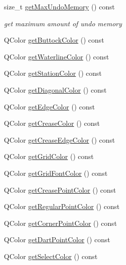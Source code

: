 \begin{DoxyCompactItemize}
size\-\_\-t \hyperlink{classShipCAD_1_1Preferences_a8ddfbabd8be21f6390f3750600047a87}{get\-Max\-Undo\-Memory} () const 
\begin{DoxyCompactList}\small\item\em get maximum amount of undo memory \end{DoxyCompactList}\item 
Q\-Color \hyperlink{classShipCAD_1_1Preferences_aa34f502af478c340ff359c76b90620c0}{get\-Buttock\-Color} () const 
\item 
Q\-Color \hyperlink{classShipCAD_1_1Preferences_a518043b34395026be6ebcf8f4e6e6591}{get\-Waterline\-Color} () const 
\item 
Q\-Color \hyperlink{classShipCAD_1_1Preferences_a39e4abd32055512f8009f4c8ab5cd379}{get\-Station\-Color} () const 
\item 
Q\-Color \hyperlink{classShipCAD_1_1Preferences_a238b56f29c89be9c2d9533cb9db21552}{get\-Diagonal\-Color} () const 
\item 
Q\-Color \hyperlink{classShipCAD_1_1Preferences_a45b78b4d109d2060ae7dd2c6da4e91df}{get\-Edge\-Color} () const 
\item 
Q\-Color \hyperlink{classShipCAD_1_1Preferences_a2d894224f95d2eff87f3086e23ae95a4}{get\-Crease\-Color} () const 
\item 
Q\-Color \hyperlink{classShipCAD_1_1Preferences_a98a2931bbf4565d110243b5c4bdca0ca}{get\-Crease\-Edge\-Color} () const 
\item 
Q\-Color \hyperlink{classShipCAD_1_1Preferences_a02a4e2aeef1d1cc16bc4a22525737866}{get\-Grid\-Color} () const 
\item 
Q\-Color \hyperlink{classShipCAD_1_1Preferences_a97b3c3d9765e4b726f20f9853d4843dd}{get\-Grid\-Font\-Color} () const 
\item 
Q\-Color \hyperlink{classShipCAD_1_1Preferences_a840bb1cce012154934fbc0996c962d45}{get\-Crease\-Point\-Color} () const 
\item 
Q\-Color \hyperlink{classShipCAD_1_1Preferences_ab4d0669d6b1a05d186b0556026e418f4}{get\-Regular\-Point\-Color} () const 
\item 
Q\-Color \hyperlink{classShipCAD_1_1Preferences_a69824380ffc1ee52bcf534604a904a96}{get\-Corner\-Point\-Color} () const 
\item 
Q\-Color \hyperlink{classShipCAD_1_1Preferences_a9b691361f319df40380305752d18af45}{get\-Dart\-Point\-Color} () const 
\item 
Q\-Color \hyperlink{classShipCAD_1_1Preferences_af54f177e516849e7f8212841db9b1ed8}{get\-Select\-Color} () const 

\end{DoxyCompactItemize}
